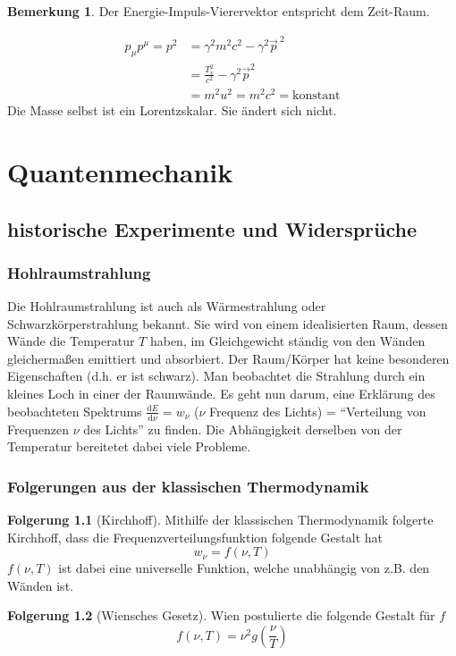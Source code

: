 \documentclass[oneside]{book}
\theoremstyle{definition}
\newtheorem*{bemerkung*}{Bemerkung}
\newtheorem*{folgerung*}{Folgerung}
\renewcommand{\d}{\mathrm d}
\newcommand{\ddd}[2]{\frac{\d #1}{\d #2}}
\newcommand{\const}{\text{konstant}}
\begin{document}
\begin{bemerkung*}
	Der Energie-Impuls-Vierervektor entspricht dem Zeit-Raum.
\end{bemerkung*}

\begin{align*}
	p_\mu p^\mu = p^2 &= \gamma^2 m^2 c^2 - \gamma^2 \vec{p}^{~2}\\
	&= \frac{T_v^2}{c^2} - \gamma^2 \vec{p}^2\\
	&= m^2 u^2 = m^2 c^2 = \const
\end{align*}
Die Masse selbst ist ein Lorentzskalar. Sie ändert sich nicht.

\chapter{Quantenmechanik}
\section{historische Experimente und Widersprüche}
\subsection{Hohlraumstrahlung} Die Hohlraumstrahlung ist auch als Wärmestrahlung oder Schwarzkörperstrahlung bekannt. Sie wird von einem idealisierten Raum, dessen Wände die Temperatur $T$ haben, im Gleichgewicht ständig von den Wänden gleichermaßen emittiert und absorbiert. Der Raum/Körper hat keine besonderen Eigenschaften (d.h. er ist schwarz). Man beobachtet die Strahlung durch ein kleines Loch in einer der Raumwände. Es geht nun darum, eine Erklärung des beobachteten Spektrums $\ddd{E}{\nu} = w_\nu$ ($\nu$ Frequenz des Lichts) = "`Verteilung von Frequenzen $\nu$ des Lichts"' zu finden. Die Abhängigkeit derselben von der Temperatur bereitetet dabei viele Probleme.

\subsection{Folgerungen aus der klassischen Thermodynamik}
\begin{folgerung*}[Kirchhoff]
	Mithilfe der klassischen Thermodynamik folgerte Kirchhoff, dass die Frequenzverteilungsfunktion folgende Gestalt hat
	$$w_\nu = f(\nu, T)$$
	$f(\nu, T)$ ist dabei eine universelle Funktion, welche unabhängig von z.B. den Wänden ist.
\end{folgerung*}

\begin{folgerung*}[Wiensches Gesetz]
Wien postulierte die folgende Gestalt für $f$
$$f(\nu, T) = \nu^2 g(\frac{\nu}{T})$$
\end{folgerung*}
\end{document}
